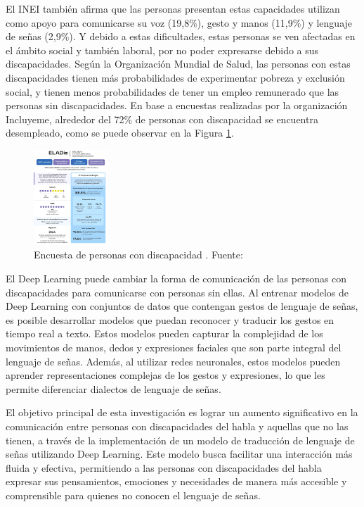 El INEI también afirma que las personas presentan estas capacidades utilizan como apoyo para comunicarse su voz (19,8\%), gesto y manos (11,9\%) y lenguaje de señas (2,9\%). Y debido a estas dificultades, estas personas se ven afectadas en el ámbito social y también laboral, por no poder expresarse debido a sus discapacidades. Según la Organización Mundial de Salud, las personas con estas discapacidades tienen más probabilidades de experimentar pobreza y exclusión social, y tienen menos probabilidades de tener un empleo remunerado que las personas sin discapacidades. En base a encuestas realizadas por la organización Incluyeme, alrededor del 72\% de personas con discapacidad se encuentra desempleado, como se puede observar en la Figura \ref{1:fig 2}.

\begin{figure}[h]
	\begin{center}
		\includegraphics[width=0.25\textwidth]{1/figures/Encuesta_personas_discapacidad.png}
		\caption{Encuesta de personas con discapacidad . Fuente: \cite{encuesta_personas_discapacidad}}
		\label{1:fig 2}
	\end{center}
\end{figure}

El Deep Learning puede cambiar la forma de comunicación de las personas con discapacidades para comunicarse con personas sin ellas. Al entrenar modelos de Deep Learning con conjuntos de datos que contengan gestos de lenguaje de señas, es posible desarrollar modelos que puedan reconocer y traducir los gestos en tiempo real a texto. Estos modelos pueden capturar la complejidad de los movimientos de manos, dedos y expresiones faciales que son parte integral del lenguaje de señas. Además, al utilizar redes neuronales, estos modelos pueden aprender representaciones complejas de los gestos y expresiones, lo que les permite diferenciar dialectos de lenguaje de señas. 

El objetivo principal de esta investigación es lograr un aumento significativo en la comunicación entre personas con discapacidades del habla y aquellas que no las tienen, a través de la implementación de un modelo de traducción de lenguaje de señas utilizando Deep Learning. Este modelo busca facilitar una interacción más fluida y efectiva, permitiendo a las personas con discapacidades del habla expresar sus pensamientos, emociones y necesidades de manera más accesible y comprensible para quienes no conocen el lenguaje de señas.

